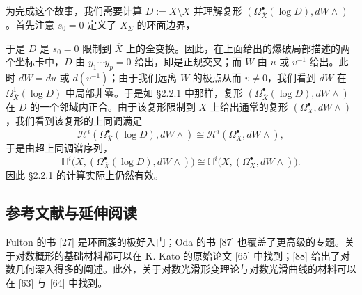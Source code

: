 为完成这个故事，我们需要计算 $D:=\overline{X}\setminus X$ 并理解复形 $(\Omega^{\bullet}_{\overline{X}}(\log D),dW\wedge)$。首先注意 $s_0=0$ 定义了 $X_{\Sigma}$ 的环面边界，

于是 $D$ 是 $s_0=0$ 限制到 $\overline{X}$ 上的全变换。因此，在上面给出的爆破局部描述的两个坐标卡中，$D$ 由 $y_1\cdots y_p=0$ 给出，即是正规交叉；而 $W$ 由 $u$ 或 $v^{-1}$ 给出。此时 $dW=du$ 或 $d(v^{-1})$；由于我们远离 $W$ 的极点从而 $v\neq0$，我们看到 $dW$ 在 $\Omega^1_{\overline{X}}(\log D)$ 中局部非零。于是如 §2.2.1 中那样，复形 $(\Omega^{\bullet}_{\overline{X}}(\log D),dW\wedge)$ 在 $D$ 的一个邻域内正合。由于该复形限制到 $X$ 上给出通常的复形 $(\Omega^{\bullet}_X,dW\wedge)$，我们看到该复形的上同调满足
\[
  \mathcal{H}^i(\Omega^{\bullet}_{\overline{X}}(\log D),dW\wedge)\cong\mathcal{H}^i(\Omega^{\bullet}_X,dW\wedge),
\]
于是由超上同调谱序列，
\[
  \mathbb{H}^i\bigl(\overline{X},(\Omega^{\bullet}_{\overline{X}}(\log D),dW\wedge)\bigr)
  \cong\mathbb{H}^i\bigl(X,(\Omega^{\bullet}_X,dW\wedge)\bigr).
\]
因此 §2.2.1 的计算实际上仍然有效。


\subsection{参考文献与延伸阅读}

Fulton 的书 [27] 是环面簇的极好入门；Oda 的书 [87] 也覆盖了更高级的专题。关于对数概形的基础材料都可以在 K. Kato 的原始论文 [65] 中找到；[88] 给出了对数几何深入得多的阐述。此外，关于对数光滑形变理论与对数光滑曲线的材料可以在 [63] 与 [64] 中找到。

